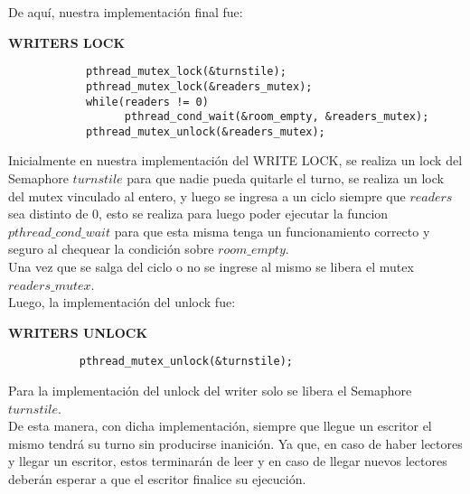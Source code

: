De aquí, nuestra implementación final fue:\\

\begin{center}
            \textbf{WRITERS LOCK}
\end{center}

 
\begin{verbatim}
            pthread_mutex_lock(&turnstile);
            pthread_mutex_lock(&readers_mutex);
            while(readers != 0)
                  pthread_cond_wait(&room_empty, &readers_mutex);
            pthread_mutex_unlock(&readers_mutex);
\end{verbatim}

Inicialmente en nuestra implementación del WRITE LOCK, se realiza un lock del Semaphore $turnstile$ para que nadie pueda quitarle el turno, se realiza un
lock del mutex vinculado al entero, y luego se ingresa a un ciclo siempre que $readers$ sea distinto de 0, esto se realiza
para luego poder ejecutar la funcion $pthread\_cond\_wait$ para que esta misma tenga un funcionamiento correcto y seguro al
chequear la condición sobre $room\_empty$.\\
Una vez que se salga del ciclo o no se ingrese al mismo se libera el mutex $readers\_mutex$.\\

Luego, la implementación del unlock fue:\\
\begin{center}
           \textbf{WRITERS UNLOCK}
\end{center}

 
\begin{verbatim}
           pthread_mutex_unlock(&turnstile);
\end{verbatim}

Para la implementación del unlock del writer solo se libera el Semaphore $turnstile$.\\

De esta manera, con dicha implementación, siempre que llegue un escritor el mismo tendrá su turno sin producirse inanición.
Ya que, en caso de haber lectores y llegar un escritor, estos terminar\'{a}n de leer y en caso 
de llegar nuevos lectores deberán esperar a que el escritor finalice su ejecución.\\

